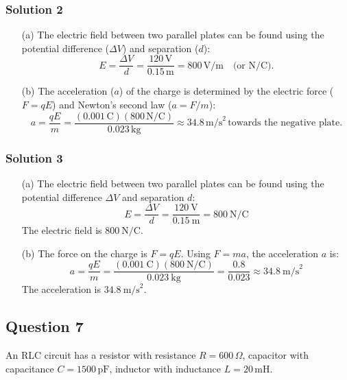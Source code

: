 \documentclass{article}
\begin{document}
\subsubsection{Solution 2}

\begin{enumerate}
    \item[(a)] The electric field between two parallel plates can be found using the potential difference (\( \Delta V \)) and separation (\( d \)):  
    \[
    E = \frac{\Delta V}{d} = \frac{120 \, \text{V}}{0.15 \, \text{m}} = 800 \, \text{V/m} \quad \text{(or N/C).}
    \]
    
    \item[(b)] The acceleration (\( a \)) of the charge is determined by the electric force (\( F = qE \)) and Newton's second law (\( a = F/m \)):  
    \[
    a = \frac{qE}{m} = \frac{(0.001 \, \text{C})(800 \, \text{N/C})}{0.023 \, \text{kg}} \approx 34.8 \, \text{m/s}^2 \, \text{towards the negative plate.}
    \]
\end{enumerate}

\subsubsection{Solution 3}
\begin{enumerate}
    \item[(a)] The electric field between two parallel plates can be found using the potential difference \( \Delta V \) and separation \( d \):
        \[
        E = \frac{\Delta V}{d} = \frac{120\ \text{V}}{0.15\ \text{m}} = 800\ \text{N/C}
        \]
        The electric field is \(\boxed{800\ \text{N/C}}\).
    
    \item[(b)] The force on the charge is \( F = qE \). Using \( F = ma \), the acceleration \( a \) is:
        \[
        a = \frac{qE}{m} = \frac{(0.001\ \text{C})(800\ \text{N/C})}{0.023\ \text{kg}} = \frac{0.8}{0.023} \approx 34.8\ \text{m/s}^2
        \]
        The acceleration is \(\boxed{34.8\ \text{m/s}^2}\).
\end{enumerate}

\subsection{Question 7}
An RLC circuit has a resistor with resistance $R = 600\,\Omega$, capacitor with capacitance $C = 1500\,\mathrm{pF}$, inductor with inductance $L = 20\,\mathrm{mH}$.  
\end{document}
